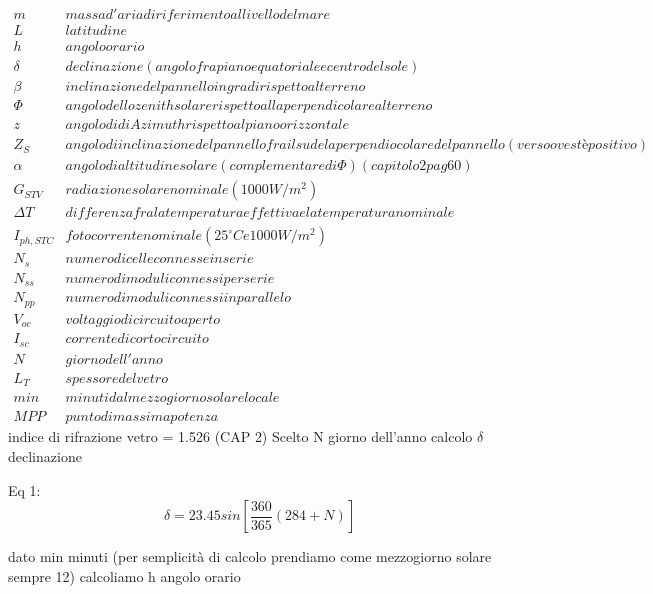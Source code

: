 \documentclass{article}
\begin{document}
\[\begin{array}{lp}
         m & massa d'aria di riferimento al livello del mare\\
         L & latitudine\\
         h & angolo orario\\
         \delta & declinazione (angolo fra piano equatoriale e  centro del sole)\\
         \beta & inclinazione del pannello in gradi rispetto al terreno\\
         \Phi & angolo dello zenith solare rispetto alla perpendicolare al terreno\\
         z & angolo di di Azimuth rispetto al piano orizzontale\\
         Z_{S} &  angolo di inclinazione del pannello fra il sud e la perpendiocolare del pannello(verso ovest è positivo)\\
         \alpha & angolo di altitudine solare (complementare di \Phi) (capitolo 2 pag 60)\\
         G_{STV} & radiazione solare nominale (1000W/m^{2})\\
         \Delta T             & differenza fra la temperatura effettiva e la temperatura nominale\\
         I_{ph,STC}         &fotocorrente nominale (25^{\circ}C e 1000W/m^{2})\\
         N_{s} & numero di celle connesse in serie\\
         N_{ss} & numero di moduli connessi per serie\\
         N_{pp} & numero di moduli connessi in parallelo\\
         V_{oc} & voltaggio di circuito aperto\\
         I_{sc} & corrente di cortocircuito\\
         N & giorno dell'anno\\
         L_{T} & spessore del vetro\\
         min & minuti dal mezzogiorno solare locale\\
         MPP & punto di massima potenza
      \end{array}
   \]
indice di rifrazione vetro = 1.526  
(CAP 2)
Scelto N giorno dell'anno calcolo $\delta$ declinazione

Eq 1:
\begin{equation}
    \delta=23.45 sin \left[\frac{360}{365}(284+N)\right]
\end{equation}

dato min minuti (per semplicità di calcolo prendiamo come mezzogiorno solare sempre 12) calcoliamo h angolo orario
\end{document}
